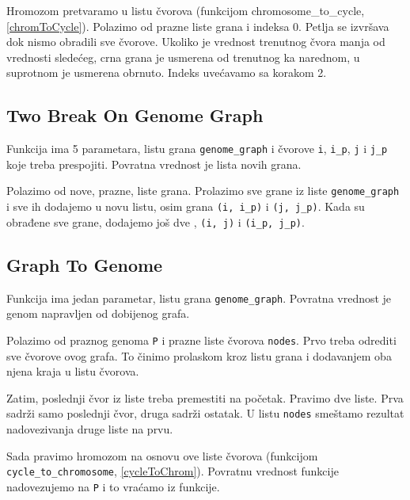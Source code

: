 Hromozom pretvaramo u listu čvorova (funkcijom chromosome\_to\_cycle, \ref{chromToCycle}). Polazimo od prazne liste grana i indeksa 0. Petlja se izvršava dok nismo obradili sve čvorove. Ukoliko je vrednost trenutnog čvora manja od vrednosti sledećeg, crna grana je usmerena od trenutnog ka narednom, u suprotnom je usmerena obrnuto. Indeks uvećavamo sa korakom 2.





\subsection{Two Break On Genome Graph}
\label{twoBreakOnGenomeGraph}

Funkcija ima 5 parametara, listu grana \texttt{genome\_graph} i čvorove \texttt{i}, \texttt{i\_p}, \texttt{j} i \texttt{j\_p} koje treba prespojiti. Povratna vrednost je lista novih grana.

Polazimo od nove, prazne, liste grana. Prolazimo sve grane iz liste \texttt{genome\_graph} i sve ih dodajemo u novu listu, osim grana \texttt{(i, i\_p)} i \texttt{(j, j\_p)}. Kada su obrađene sve grane, dodajemo još dve , \texttt{(i, j)} i \texttt{(i\_p, j\_p)}.




\subsection{Graph To Genome}
\label{graphToGenome}

Funkcija ima jedan parametar, listu grana \texttt{genome\_graph}. Povratna vrednost je genom napravljen od dobijenog grafa.

Polazimo od praznog genoma \texttt{P} i prazne liste čvorova \texttt{nodes}. Prvo treba odrediti sve čvorove ovog grafa. To činimo prolaskom kroz listu grana i dodavanjem oba njena kraja u listu čvorova.

Zatim, poslednji čvor iz liste treba premestiti na početak. Pravimo dve liste. Prva sadrži samo poslednji čvor, druga sadrži ostatak. U listu \texttt{nodes} smeštamo rezultat nadovezivanja druge liste na prvu.

Sada pravimo hromozom na osnovu ove liste čvorova (funkcijom \texttt{cycle\_to\_chromosome}, \ref{cycleToChrom}). Povratnu vrednost funkcije nadovezujemo na \texttt{P} i to vraćamo iz funkcije.





